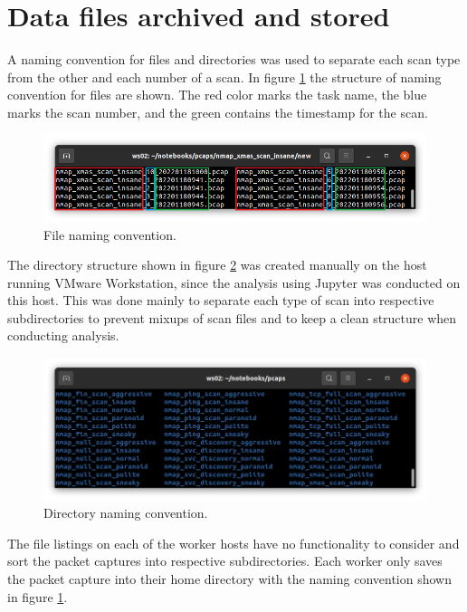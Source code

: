 \section{Data files archived and stored}
\label{s:DataFilesArchived}
A naming convention for files and directories was used to separate each scan type from the other and each number of a scan.
In figure \ref{fig:FileNamingStructure} the structure of naming convention for files are shown.
The red color marks the task name, the blue marks the scan number, and the green contains the timestamp for the scan.
\begin{figure}[htbp]
\centerline{\includegraphics[scale=0.7]{images/misc/Files.png}}
\caption{File naming convention.}
\label{fig:FileNamingStructure}
\end{figure}

The directory structure shown in figure \ref{fig:DirNamingStructure} was created manually on the host running VMware Workstation, since the analysis using Jupyter was conducted on this host.
This was done mainly to separate each type of scan into respective subdirectories to prevent mixups of scan files and to keep a clean structure when conducting analysis.

\begin{figure}[htbp]
\centerline{\includegraphics[scale=0.6]{images/misc/Directories.png}}
\caption{Directory naming convention.}
\label{fig:DirNamingStructure}
\end{figure}

The file listings on each of the worker hosts have no functionality to consider and sort the packet captures into respective subdirectories.
Each worker only saves the packet capture into their home directory with the naming convention shown in figure \ref{fig:FileNamingStructure}.

